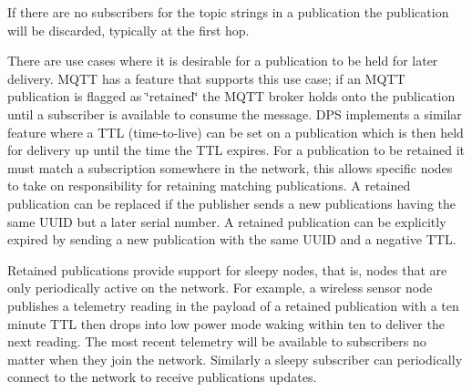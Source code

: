 If there are no subscribers for the topic strings in a publication the publication will be discarded, typically at the first hop.

There are use cases where it is desirable for a publication to be held for later delivery. M\+Q\+TT has a feature that supports this use case; if an M\+Q\+TT publication is flagged as \char`\"{}retained\char`\"{} the M\+Q\+TT broker holds onto the publication until a subscriber is available to consume the message. D\+PS implements a similar feature where a T\+TL (time-\/to-\/live) can be set on a publication which is then held for delivery up until the time the T\+TL expires. For a publication to be retained it must match a subscription somewhere in the network, this allows specific nodes to take on responsibility for retaining matching publications. A retained publication can be replaced if the publisher sends a new publications having the same U\+U\+ID but a later serial number. A retained publication can be explicitly expired by sending a new publication with the same U\+U\+ID and a negative T\+TL.

Retained publications provide support for sleepy nodes, that is, nodes that are only periodically active on the network. For example, a wireless sensor node publishes a telemetry reading in the payload of a retained publication with a ten minute T\+TL then drops into low power mode waking within ten to deliver the next reading. The most recent telemetry will be available to subscribers no matter when they join the network. Similarly a sleepy subscriber can periodically connect to the network to receive publications updates. 